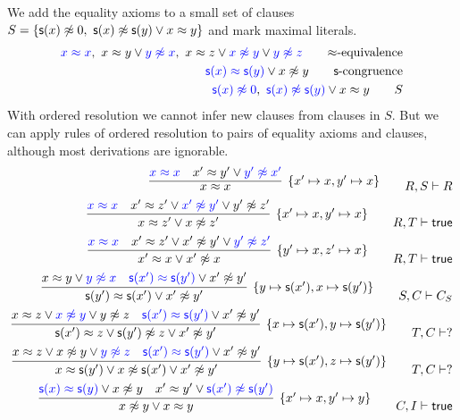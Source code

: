 \begin{example}
	We add the equality axioms to a small set of clauses
	$S = \{ \mathsf{s}(x)\not\approx 0,\ \mathsf{s}(x)\not\approx\mathsf{s}(y)\lor x\approx y \}$ and mark maximal literals.
	\begin{align*}
	{\colN x \mEQ x},\
	x \mEQ y \lor {\colN y \mNE x},\
	x \mEQ z \lor {\colN x \mNE y} \lor {\colN y\mNE z}
\tag*{$\mEQ$-equivalence}
\\
	{\colN \msucc(x) \mEQ \msucc(y)} \lor x\mNE y
	\tag*{$\msucc$-congruence}
\\
	{\colN \msucc(x)\mNE 0},\
	{\colN \msucc(x) \mNE \msucc(y)} \lor x \mEQ y
\tag*{$S$}
	\end{align*}
	With ordered resolution we cannot infer new clauses from clauses in $S$.
	But we can apply rules of ordered resolution to pairs of equality axioms and clauses,
	although most derivations are ignorable.
	\begin{align*}
\infer[\{x'\mapsto x, y'\mapsto x\}]
{x \mEQ x}
{{\colN x \mEQ x} & x' \mEQ y' \lor {\colN y' \mNE x'}}
\tag*{$R,S\proves R$}
\\
\infer[\{x'\mapsto x,y'\mapsto x \}]
{x\mEQ z'\lor x\mNE z'  }
{{\colN x \mEQ x} & x' \mEQ z' \lor {\colN x' \mNE y'} \lor {y'\mNE z'}}
\tag*{$R,T\proves\true$}
\\
\infer[\{y'\mapsto x, z'\mapsto x \}]
{x'\mEQ x\lor x'\mNE x  }
{{\colN x \mEQ x} & x' \mEQ z' \lor {x' \mNE y'} \lor {\colN y'\mNE z'}}
\tag*{$R,T\proves\true$}
\\
\infer[\{y\mapsto \msucc(x'), x\mapsto\msucc(y')\}]
{\msucc(y')\mEQ\msucc(x')\lor x'\mNE y'}
{x \mEQ y \lor {\colN y \mNE x} & {\colN \msucc(x') \mEQ \msucc(y')} \lor x'\mNE y'}
\tag*{$S,C\proves C_S$}
\\
\infer[\{x\mapsto\msucc(x'),y\mapsto\msucc(y')\}]
{\msucc(x')\mEQ z\lor \msucc(y')\mNE z \lor x'\mNE y'}
{x \mEQ z \lor {\colN x \mNE y} \lor {y\mNE z} & {\colN \msucc(x') \mEQ \msucc(y')} \lor x'\mNE y'}
\tag*{$T,C\proves ?$}
\\
\infer[\{y\mapsto\msucc(x'),z\mapsto\msucc(y')\}]
{x\mEQ\msucc(y')\lor x\mNE\msucc(x')\lor x'\mNE y'}
{x \mEQ z \lor {x \mNE y} \lor {\colN y\mNE z} & {\colN \msucc(x') \mEQ \msucc(y')} \lor x'\mNE y'}
\tag*{$T,C\proves ?$}
\\
\infer[\{x'\mapsto x, y'\mapsto y\}]
{x\mNE y\lor x\mEQ y}
{{\colN \msucc(x) \mEQ \msucc(y)} \lor x\mNE y & x' \mEQ y' \lor {\colN \msucc(x') \mNE \msucc(y')}}
\tag*{$C,I\proves\true$}
\\
	\end{align*}
\end{example}

